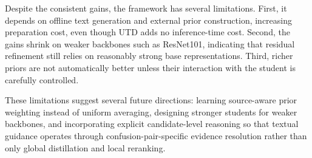Despite the consistent gains, the framework has several limitations. First, it depends on offline text generation and external prior construction, increasing preparation cost, even though UTD adds no inference-time cost. Second, the gains shrink on weaker backbones such as ResNet101, indicating that residual refinement still relies on reasonably strong base representations. Third, richer priors are not automatically better unless their interaction with the student is carefully controlled. 

These limitations suggest several future directions: learning source-aware prior weighting instead of uniform averaging, designing stronger students for weaker backbones, and incorporating explicit candidate-level reasoning so that textual guidance operates through confusion-pair-specific evidence resolution rather than only global distillation and local reranking.
